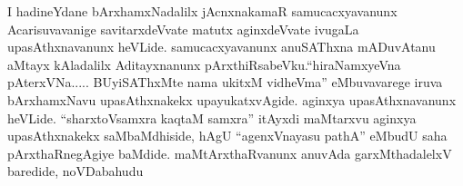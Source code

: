 \begin{artha}
I hadineYdane bArxhamxNadalilx jAcnxnakamaR samucacxyavanunx Acarisuvavanige savitarxdeVvate matutx aginxdeVvate ivugaLa upasAthxnavanunx heVLide. samucacxyavanunx anuSAThxna mADuvAtanu aMtayx kAladalilx Aditayxnanunx pArxthiRsabeVku.\break ``hiraNamxyeVna pAterxVNa..... BUyiSAThxMte nama ukitxM vidheVma'' eMbuvavarege iruva bArxhamxNavu upasAthxnakekx upayukatxvAgide. aginxya upasAthxnavanunx heVLide. ``sharxtoVsamxra kaqtaM samxra'' itAyxdi maMtarxvu aginxya upasAthxnakekx saMbaMdhiside, hAgU ``agenxVnayasu pathA'' eMbudU saha pArxthaRnegAgiye baMdide. maMtArxthaRvanunx anuvAda garxMthadalelxV baredide, noVDabahudu\ndash 
\end{artha}

\centerline{}
